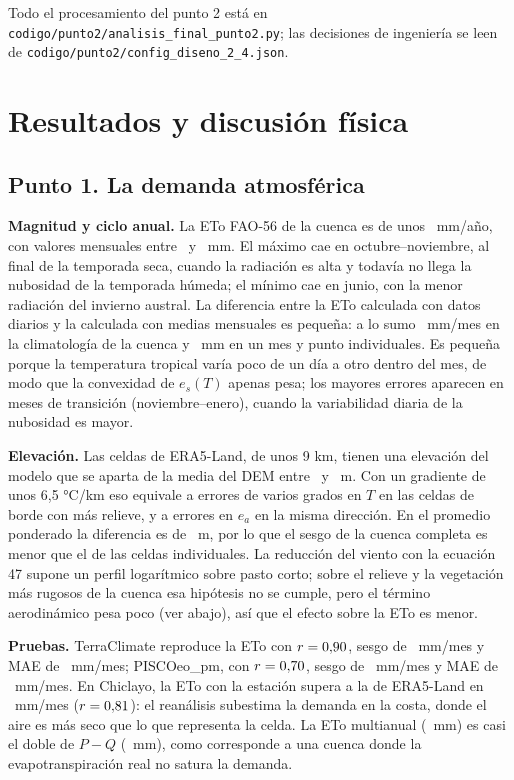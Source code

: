 \documentclass[12pt,a4paper]{article}
\begin{document}
Todo el procesamiento del punto 2 está en \texttt{codigo/punto2/analisis\_final\_punto2.py}; las decisiones de ingeniería se leen de \texttt{codigo/punto2/config\_diseno\_2\_4.json}.

\section{Resultados y discusión física}

\subsection{Punto 1. La demanda atmosférica}

\textbf{Magnitud y ciclo anual.} La ETo FAO-56 de la cuenca es de unos \EToAnual\ mm/año, con valores mensuales entre \EToMesMin\ y \EToMesMax\ mm. El máximo cae en octubre--noviembre, al final de la temporada seca, cuando la radiación es alta y todavía no llega la nubosidad de la temporada húmeda; el mínimo cae en junio, con la menor radiación del invierno austral. La diferencia entre la ETo calculada con datos diarios y la calculada con medias mensuales es pequeña: a lo sumo \DifPromMax\ mm/mes en la climatología de la cuenca y \DifPuntoMax\ mm en un mes y punto individuales. Es pequeña porque la temperatura tropical varía poco de un día a otro dentro del mes, de modo que la convexidad de $e_s(T)$ apenas pesa; los mayores errores aparecen en meses de transición (noviembre--enero), cuando la variabilidad diaria de la nubosidad es mayor.

\textbf{Elevación.} Las celdas de ERA5-Land, de unos 9 km, tienen una elevación del modelo que se aparta de la media del DEM entre \DzMin\ y \DzMax\ m. Con un gradiente de unos 6,5 °C/km eso equivale a errores de varios grados en $T$ en las celdas de borde con más relieve, y a errores en $e_a$ en la misma dirección. En el promedio ponderado la diferencia es de \DzPond\ m, por lo que el sesgo de la cuenca completa es menor que el de las celdas individuales. La reducción del viento con la ecuación 47 supone un perfil logarítmico sobre pasto corto; sobre el relieve y la vegetación más rugosos de la cuenca esa hipótesis no se cumple, pero el término aerodinámico pesa poco (ver abajo), así que el efecto sobre la ETo es menor.

\textbf{Pruebas.} TerraClimate reproduce la ETo con $r=0{,}90$, sesgo de \TCsesgo\ mm/mes y MAE de \TCmae\ mm/mes; PISCOeo\_pm, con $r=0{,}70$, sesgo de \PIsesgo\ mm/mes y MAE de \PImae\ mm/mes. En Chiclayo, la ETo con la estación supera a la de ERA5-Land en \NOsesgo\ mm/mes ($r=0{,}81$): el reanálisis subestima la demanda en la costa, donde el aire es más seco que lo que representa la celda. La ETo multianual (\EToFis\ mm) es casi el doble de $P-Q$ (\PmQfis\ mm), como corresponde a una cuenca donde la evapotranspiración real no satura la demanda.
\end{document}
